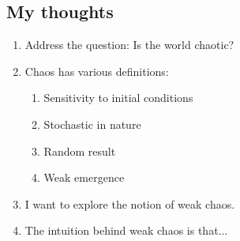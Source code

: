 \documentclass[11pt]{article}
\begin{document}
    \subsection{My thoughts}
        \begin{enumerate}
            \item Address the question: Is the world chaotic?
            \item Chaos has various definitions:
                \begin{enumerate}
                    \item Sensitivity to initial conditions
                    \item Stochastic in nature
                    \item Random result
                    \item Weak emergence
                \end{enumerate}
            \item I want to explore the notion of weak chaos. 
            \item The intuition behind weak chaos is that...
        \end{enumerate}
\end{document}
